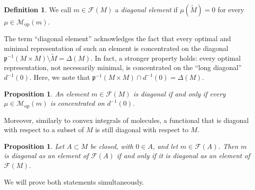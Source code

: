 \documentclass[a4paper,10pt]{amsart}
\newcommand{\lipfree}[1]{\mathcal{F}({#1})}                 %
\newcommand{\wt}[1]{\widetilde{#1}}                         %
\newcommand{\pp}{\mathfrak{p}}                              %
\newcommand{\opr}[1]{\mathcal{M}_{\mathrm{op}}(#1)}         %
\theoremstyle{plain}
\newtheorem{proposition}[theorem]{Proposition}
\theoremstyle{definition}
\newtheorem{definition}[theorem]{Definition}
\theoremstyle{remark}
\begin{document}
\begin{definition}
We call $m \in \lipfree{M}$ a \emph{diagonal element} if $\mu(\wt{M})=0$ for every $\mu \in \opr{m}$.
\end{definition}

The term ``diagonal element'' acknowledges the fact that every optimal and minimal representation of such an element is concentrated on the diagonal $\pp^{-1}(M\times M)\setminus\wt{M}=\Delta(M)$. In fact, a stronger property holds: every optimal representation, not necessarily minimal, is concentrated on the ``long diagonal'' $d^{-1}(0)$. Here, we note that $\pp^{-1}(M\times M) \cap d^{-1}(0) = \Delta(M)$.

\begin{proposition}\label{pr:diagonal}
An element $m\in\lipfree{M}$ is diagonal if and only if every $\mu\in\opr{m}$ is concentrated on $d^{-1}(0)$.
\end{proposition}

Moreover, similarly to convex integrals of molecules, a functional that is diagonal with respect to a subset of $M$ is still diagonal with respect to $M$.

\begin{proposition}\label{pr:diagonal ambient}
Let $A \subset M$ be closed, with $0 \in A$, and let $m \in \lipfree{A}$. Then $m$ is diagonal as an element of $\lipfree{A}$ if and only if it is diagonal as an element of $\lipfree{M}$.
\end{proposition}

We will prove both statements simultaneously.
\end{document}
